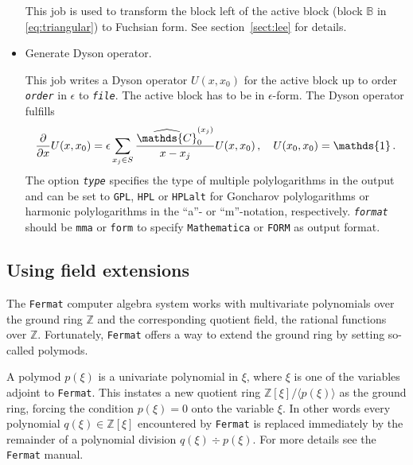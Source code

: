 \documentclass[12pt]{article}
\numberwithin{equation}{section}
\numberwithin{figure}{section}
\newcommand{\B}{\mathds{B}}
\newcommand{\C}{\mathds{C}}
\newcommand{\id}{\mathds{1}}
\newcommand{\uoption}[2]{{\makebox[18em][l]{\texttt{#1}:}\parbox[t]{\dimexpr\linewidth-18em\relax}{#2}}\vspace{1ex}}
\begin{document}
\begin{itemize}
            This job is used to transform the block left of the active block (block $\B$ in \eqref{eq:triangular}) to Fuchsian form.
            See section~\ref{sect:lee} for details.
          \item
            \uoption{--dyson \textit{file} \textit{order} \textit{type} \textit{format}}{Generate Dyson operator.}

            This job writes a Dyson operator $U(x,x_0)$ for the active block up to order \texttt{\textit{order}} in $\epsilon$ to \texttt{\textit{file}}.
            The active block has to be in $\epsilon$-form.
            The Dyson operator fulfills
            \[
              \frac{\partial}{\partial x}
              U(x,x_0)
              =
              \epsilon \sum\limits_{x_j \in S} 
              \frac{\widehat\C^{(x_j)}_0}{x-x_j}
              U(x,x_0)
              \,, \quad
              U(x_0,x_0) = \id\,.
            \]
            The option \texttt{\textit{type}} specifies the type of multiple polylogarithms in the output and can be set to \texttt{GPL}, \texttt{HPL} or \texttt{HPLalt} for Goncharov polylogarithms\cite{Goncharov:2010jf} or harmonic polylogarithms in the ``a''- or ``m''-notation\cite{Remiddi:1999ew,Maitre:2005uu}, respectively.
            \texttt{\textit{format}} should be \texttt{mma} or \texttt{form} to specify \texttt{Mathematica} or \texttt{FORM}\cite{Vermaseren:2000nd} as output format.
        \end{itemize}
    \subsection{Using field extensions} \label{sect:usage_field}
        The \texttt{Fermat} computer algebra system works with multivariate polynomials over the ground ring $\mathds{Z}$ and the corresponding quotient field, the rational functions over $\mathds{Z}$.
        Fortunately, \texttt{Fermat} offers a way to extend the ground ring by setting so-called polymods.

        A polymod $p(\xi)$ is a univariate polynomial in $\xi$, where $\xi$ is one of the variables adjoint to \texttt{Fermat}.
        This instates a new quotient ring $\mathds{Z}[\xi]/\langle p(\xi) \rangle$ as the ground ring, forcing the condition $p(\xi) = 0$ onto the variable $\xi$.
        In other words every polynomial $q(\xi) \in \mathds{Z}[\xi]$ encountered by \texttt{Fermat} is replaced immediately by the remainder of a polynomial division $q(\xi)\div p(\xi)$.
        For more details see the \texttt{Fermat} manual\cite{Lewis:fermat}.
\end{document}
